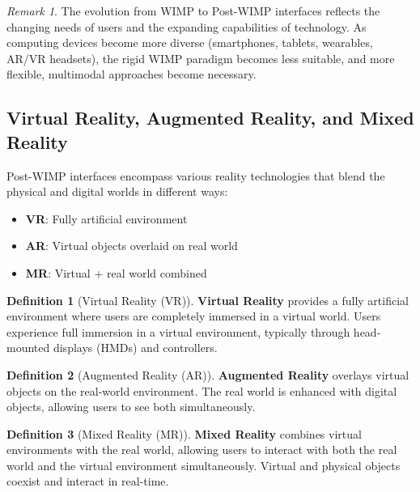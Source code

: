 \documentclass[11pt,a4paper]{article}
\theoremstyle{definition}
\newtheorem{definition}{Definition}[section]
\theoremstyle{plain}
\theoremstyle{remark}
\newtheorem*{remark}{Remark}
\begin{document}
\begin{remark}
The evolution from WIMP to Post-WIMP interfaces reflects the changing needs of users and the expanding capabilities of technology. As computing devices become more diverse (smartphones, tablets, wearables, AR/VR headsets), the rigid WIMP paradigm becomes less suitable, and more flexible, multimodal approaches become necessary.
\end{remark}

\subsection{Virtual Reality, Augmented Reality, and Mixed Reality}

Post-WIMP interfaces encompass various reality technologies that blend the physical and digital worlds in different ways:

\begin{tcolorbox}[colback=magenta!5!white,colframe=magenta!75!black,title=\textbf{Reality Technologies}]
\begin{itemize}
    \item \textbf{VR}: Fully artificial environment
    \item \textbf{AR}: Virtual objects overlaid on real world
    \item \textbf{MR}: Virtual + real world combined
\end{itemize}
\end{tcolorbox}

\begin{definition}[Virtual Reality (VR)]
\textbf{Virtual Reality} provides a fully artificial environment where users are completely immersed in a virtual world. Users experience full immersion in a virtual environment, typically through head-mounted displays (HMDs) and controllers.
\end{definition}

\begin{definition}[Augmented Reality (AR)]
\textbf{Augmented Reality} overlays virtual objects on the real-world environment. The real world is enhanced with digital objects, allowing users to see both simultaneously.
\end{definition}

\begin{definition}[Mixed Reality (MR)]
\textbf{Mixed Reality} combines virtual environments with the real world, allowing users to interact with both the real world and the virtual environment simultaneously. Virtual and physical objects coexist and interact in real-time.
\end{definition}
\end{document}
